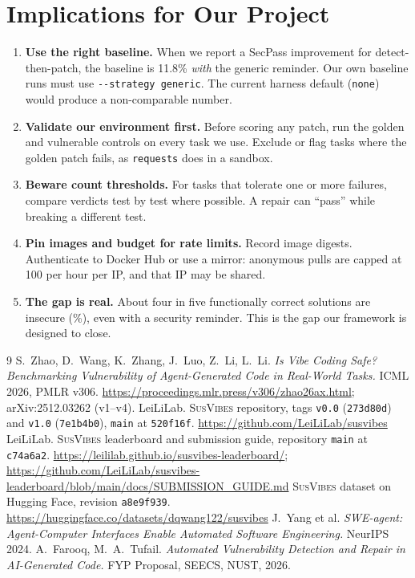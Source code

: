 \documentclass[11pt,a4paper]{article}
\newcommand{\SV}{\textsc{SusVibes}}
\begin{document}
\section{Implications for Our Project}
\begin{enumerate}[nosep]
  \item \textbf{Use the right baseline.} When we report a SecPass improvement for detect-then-patch, the baseline
  is 11.8\% \emph{with} the generic reminder. Our own baseline runs must use \texttt{-{}-strategy generic}. The
  current harness default (\texttt{none}) would produce a non-comparable number.
  \item \textbf{Validate our environment first.} Before scoring any patch, run the golden and vulnerable controls
  on every task we use. Exclude or flag tasks where the golden patch fails, as \texttt{requests} does in a
  sandbox.
  \item \textbf{Beware count thresholds.} For tasks that tolerate one or more failures, compare verdicts
  test by test where possible. A repair can ``pass'' while breaking a different test.
  \item \textbf{Pin images and budget for rate limits.} Record image digests. Authenticate to Docker Hub or use a
  mirror: anonymous pulls are capped at 100 per hour per IP, and that IP may be shared.
  \item \textbf{The gap is real.} About four in five functionally correct solutions are insecure (\InsecSharePct\%),
  even with a security reminder. This is the gap our framework is designed to close.
\end{enumerate}

\begin{thebibliography}{9}
 S.~Zhao, D.~Wang, K.~Zhang, J.~Luo, Z.~Li, L.~Li. \emph{Is Vibe Coding Safe? Benchmarking
Vulnerability of Agent-Generated Code in Real-World Tasks.} ICML 2026, PMLR v306.
\url{https://proceedings.mlr.press/v306/zhao26ax.html}; arXiv:2512.03262 (v1--v4).
 LeiLiLab. \SV{} repository, tags \texttt{v0.0} (\texttt{273d80d}) and \texttt{v1.0} (\texttt{7e1b4b0}),
\texttt{main} at \texttt{520f16f}. \url{https://github.com/LeiLiLab/susvibes}
 LeiLiLab. \SV{} leaderboard and submission guide, repository \texttt{main} at \texttt{c74a6a2}.
\url{https://leililab.github.io/susvibes-leaderboard/};
\url{https://github.com/LeiLiLab/susvibes-leaderboard/blob/main/docs/SUBMISSION_GUIDE.md}
 \SV{} dataset on Hugging Face, revision \texttt{a8e9f939}.
\url{https://huggingface.co/datasets/dqwang122/susvibes}
 J.~Yang et al. \emph{SWE-agent: Agent-Computer Interfaces Enable Automated Software
Engineering.} NeurIPS 2024.
 A.~Farooq, M.~A.~Tufail. \emph{Automated Vulnerability Detection and Repair in AI-Generated
Code.} FYP Proposal, SEECS, NUST, 2026.
\end{thebibliography}
\end{document}
